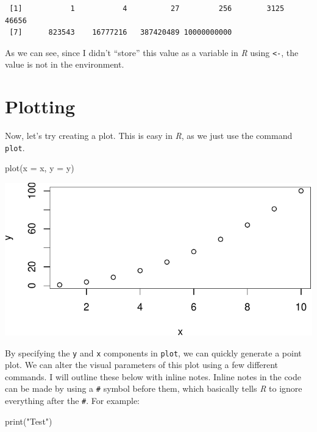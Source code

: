 \documentclass[
  letterpaper,
  DIV=11,
  numbers=noendperiod]{scrreprt}
\newenvironment{Shaded}{\begin{snugshade}}{\end{snugshade}}
\newcommand{\AttributeTok}[1]{\textcolor[rgb]{0.40,0.45,0.13}{#1}}
\newcommand{\FunctionTok}[1]{\textcolor[rgb]{0.28,0.35,0.67}{#1}}
\newcommand{\NormalTok}[1]{\textcolor[rgb]{0.00,0.23,0.31}{#1}}
\newcommand{\StringTok}[1]{\textcolor[rgb]{0.13,0.47,0.30}{#1}}
\begin{document}
\begin{verbatim}
 [1]           1           4          27         256        3125       46656
 [7]      823543    16777216   387420489 10000000000
\end{verbatim}

As we can see, since I didn't ``store'' this value as a variable in
\emph{R} using \texttt{\textless{}-}, the value is not in the
environment.

\section{Plotting}\label{plotting}

Now, let's try creating a plot. This is easy in \emph{R}, as we just use
the command \texttt{plot}.

\begin{Shaded}
\begin{Highlighting}[]
\FunctionTok{plot}\NormalTok{(}\AttributeTok{x =}\NormalTok{ x, }\AttributeTok{y =}\NormalTok{ y)}
\end{Highlighting}
\end{Shaded}

\includegraphics{intro_to_r_files/figure-pdf/unnamed-chunk-5-1.pdf}

By specifying the \texttt{y} and \texttt{x} components in \texttt{plot},
we can quickly generate a point plot. We can alter the visual parameters
of this plot using a few different commands. I will outline these below
with inline notes. Inline notes in the code can be made by using a
\texttt{\#} symbol before them, which basically tells \emph{R} to ignore
everything after the \texttt{\#}. For example:

\begin{Shaded}
\begin{Highlighting}[]
\FunctionTok{print}\NormalTok{(}\StringTok{"Test"}\NormalTok{)}
\end{Highlighting}
\end{Shaded}
\end{document}
